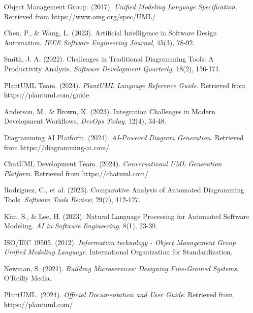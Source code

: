 
\begin{thebibliography}{99}

    Object Management Group. (2017). \textit{Unified Modeling Language Specification}. Retrieved from https://www.omg.org/spec/UML/
    
    Chen, P., \& Wang, L. (2023). Artificial Intelligence in Software Design Automation. \textit{IEEE Software Engineering Journal}, 45(3), 78-92.
    
    Smith, J. A. (2022). Challenges in Traditional Diagramming Tools: A Productivity Analysis. \textit{Software Development Quarterly}, 18(2), 156-171.
    
    PlantUML Team. (2024). \textit{PlantUML Language Reference Guide}. Retrieved from https://plantuml.com/guide
    
    Anderson, M., \& Brown, K. (2023). Integration Challenges in Modern Development Workflows. \textit{DevOps Today}, 12(4), 34-48.
    
    Diagramming AI Platform. (2024). \textit{AI-Powered Diagram Generation}. Retrieved from https://diagramming-ai.com/
    
    ChatUML Development Team. (2024). \textit{Conversational UML Generation Platform}. Retrieved from https://chatuml.com/
    
    Rodriguez, C., et al. (2023). Comparative Analysis of Automated Diagramming Tools. \textit{Software Tools Review}, 29(7), 112-127.
    
    Kim, S., \& Lee, H. (2023). Natural Language Processing for Automated Software Modeling. \textit{AI in Software Engineering}, 8(1), 23-39.
    
    ISO/IEC 19505. (2012). \textit{Information technology - Object Management Group Unified Modeling Language}. International Organization for Standardization.
    
    Newman, S. (2021). \textit{Building Microservices: Designing Fine-Grained Systems}. O'Reilly Media.
    
    PlantUML. (2024). \textit{Official Documentation and User Guide}. Retrieved from https://plantuml.com/
    

\end{thebibliography}
